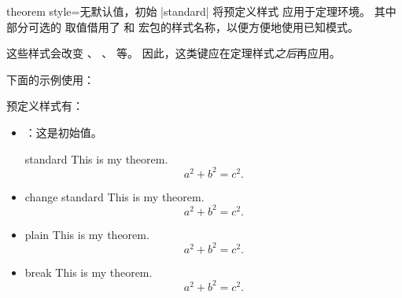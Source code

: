 \clearpage
\begin{docTcbKey}{theorem style}{=}{无默认值，初始 |standard|}
  将预定义样式  应用于定理环境。
  其中部分可选的  取值借用了  和
   宏包的样式名称，以便方便地使用已知模式。
\begin{marker}
这些样式会改变 、
、 等。
因此，这类键应在定理样式\emph{之后}再应用。
\end{marker}

下面的示例使用：

预定义样式有：
\begin{itemize}
%
\item{}：这是初始值。
\begin{dispExample}
\begin{theorem}[theorem style=standard]{standard}{}
This is my theorem. \begin{equation*} a^2 + b^2 = c^2. \end{equation*}
\end{theorem}
\end{dispExample}
%
\item{}
\begin{dispExample}
\begin{theorem}[theorem style=change standard]{change standard}{}
This is my theorem. \begin{equation*} a^2 + b^2 = c^2. \end{equation*}
\end{theorem}
\end{dispExample}
%
\item{}
\begin{dispExample}
\begin{theorem}[theorem style=plain]{plain}{}
This is my theorem. \begin{equation*} a^2 + b^2 = c^2. \end{equation*}
\end{theorem}
\end{dispExample}
%
\clearpage
\item{}
\begin{dispExample}
\begin{theorem}[theorem style=break]{break}{}
This is my theorem. \begin{equation*} a^2 + b^2 = c^2. \end{equation*}

\end{theorem}
\end{dispExample}
\end{itemize}
\end{docTcbKey}
